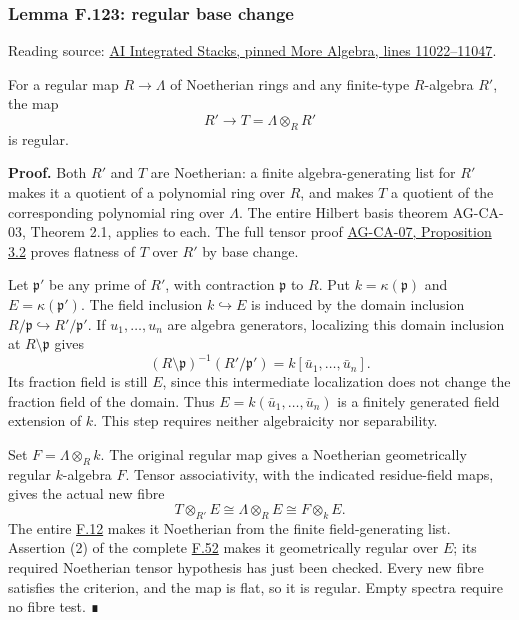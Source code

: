 \documentclass[11pt,a4paper,openany]{report}
\begin{document}
\label{AG-RG-S05-more-algebra-lemma-regular-base-change}

\subsubsection{Lemma F.123: regular base change}\label{AG-RG-S05-lemma-f.123-regular-base-change}

Reading source: \href{https://github.com/KokunoYumeto/unofficial-stacks-project-ai-drafts/blob/565b10e987aba5969b21145a0833f42d69f96790/more-algebra.tex\#L11022-L11047}{AI Integrated Stacks, pinned More Algebra, lines 11022--11047}.

For a regular map \(R\to\Lambda\) of Noetherian rings and any finite-type \(R\)-algebra \(R'\), the map \[R'\longrightarrow T=\Lambda\otimes_RR'\] is regular.

\textbf{Proof.} Both \(R'\) and \(T\) are Noetherian: a finite algebra-generating list for \(R'\) makes it a quotient of a polynomial ring over \(R\), and makes \(T\) a quotient of the corresponding polynomial ring over \(\Lambda\). The entire Hilbert basis theorem AG-CA-03, Theorem 2.1, applies to each. The full tensor proof \href{https://github.com/KokunoYumeto/open-math-courses/blob/d02d0a3669f42579db037cd44de1d113fdd770a1/docs/courses/AG-CA/src/tor-and-flat-modules.md}{AG-CA-07, Proposition 3.2} proves flatness of \(T\) over \(R'\) by base change.

Let \(\mathfrak p'\) be any prime of \(R'\), with contraction \(\mathfrak p\) to \(R\). Put \(k=\kappa(\mathfrak p)\) and \(E=\kappa(\mathfrak p')\). The field inclusion \(k\hookrightarrow E\) is induced by the domain inclusion \(R/\mathfrak p\hookrightarrow R'/\mathfrak p'\). If \(u_1,\ldots,u_n\) are algebra generators, localizing this domain inclusion at \(R\setminus\mathfrak p\) gives \[
(R\setminus\mathfrak p)^{-1}(R'/\mathfrak p')
=k[\bar u_1,\ldots,\bar u_n].
\] Its fraction field is still \(E\), since this intermediate localization does not change the fraction field of the domain. Thus \(E=k(\bar u_1,\ldots,\bar u_n)\) is a finitely generated field extension of \(k\). This step requires neither algebraicity nor separability.

Set \(F=\Lambda\otimes_Rk\). The original regular map gives a Noetherian geometrically regular \(k\)-algebra \(F\). Tensor associativity, with the indicated residue-field maps, gives the actual new fibre \[T\otimes_{R'}E\cong\Lambda\otimes_RE\cong F\otimes_kE.\] The entire \hyperref[AG-RG-S05-algebra-lemma-Noetherian-field-extension]{F.12} makes it Noetherian from the finite field-generating list. Assertion (2) of the complete \hyperref[AG-RG-S05-algebra-lemma-geometrically-regular-over-subfields]{F.52} makes it geometrically regular over \(E\); its required Noetherian tensor hypothesis has just been checked. Every new fibre satisfies the criterion, and the map is flat, so it is regular. Empty spectra require no fibre test. ∎
\end{document}
